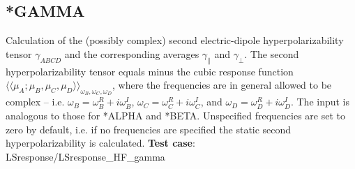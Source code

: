 \subsection{*GAMMA}\label{subsec:gamma}
Calculation of the (possibly complex)  second electric-dipole 
hyperpolarizability tensor $\gamma_{ABCD}$ and 
the corresponding averages $\gamma_{\parallel}$ and
$\gamma_{\perp}$. 
The second hyperpolarizability tensor equals minus the cubic response function
$\langle\langle \mu_A; \mu_B, \mu_C, \mu_D \rangle\rangle_{\omega_B, \omega_C, \omega_D}$, where
the frequencies are in general allowed to be complex --
i.e. $\omega_B = \omega_B^R + i \omega_B^I$,
$\omega_C = \omega_C^R + i \omega_C^I$, and
$\omega_D = \omega_D^R + i \omega_D^I$.
The input is analogous to those for *ALPHA and *BETA.
Unspecified frequencies are set to zero by default,
i.e. if no frequencies are specified the static second hyperpolarizability is calculated. \newline
{\bf Test case}: LSresponse/LSresponse\_HF\_gamma 

